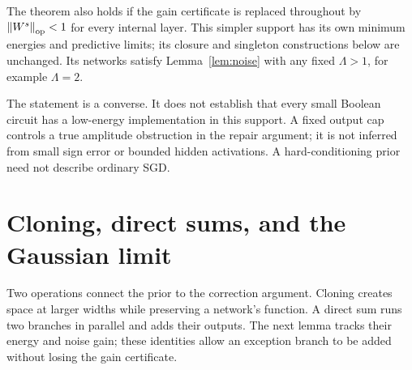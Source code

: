 \documentclass[11pt]{article}
\theoremstyle{remark}\newtheorem{remark}[theorem]{Remark}
\newcommand{\norm}[1]{\left\lVert#1\right\rVert}
\begin{document}
The theorem also holds if the gain certificate is replaced throughout by
$\norm{W^s}_{\rm op}<1$ for every internal layer. This simpler support
has its own minimum energies and predictive limits; its closure and
singleton constructions below are unchanged. Its networks satisfy
Lemma~\ref{lem:noise} with any fixed $\Lambda>1$, for example $\Lambda=2$.

The statement is a converse. It does not establish that every small
Boolean circuit has a low-energy implementation in this support.
A fixed output cap controls a true amplitude obstruction in the repair
argument; it is not inferred from small sign error or bounded hidden
activations. A hard-conditioning prior need not describe ordinary SGD.

\section{Cloning, direct sums, and the Gaussian limit}

Two operations connect the prior to the correction argument. Cloning
creates space at larger widths while preserving a network's function.
A direct sum runs two branches in parallel and adds their outputs. The
next lemma tracks their energy and noise gain; these identities allow an
exception branch to be added without losing the gain certificate.
\end{document}
